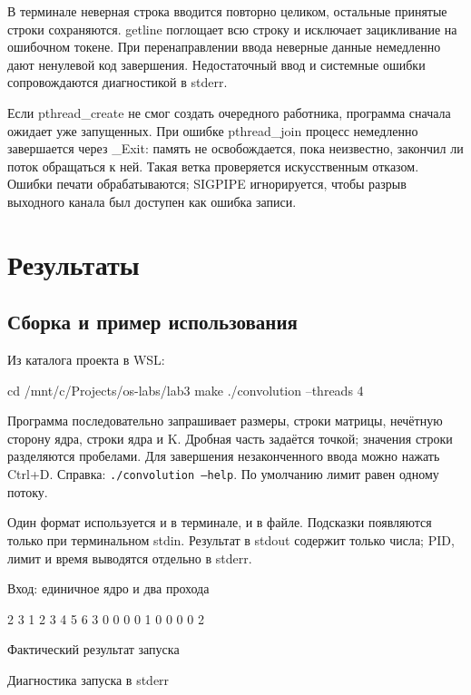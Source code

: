\documentclass[12pt,a4paper]{article}
\begin{document}
В терминале неверная строка вводится повторно целиком, остальные принятые строки сохраняются. getline поглощает всю строку и исключает зацикливание на ошибочном токене. При перенаправлении ввода неверные данные немедленно дают ненулевой код завершения. Недостаточный ввод и системные ошибки сопровождаются диагностикой в stderr.

Если pthread\_create не смог создать очередного работника, программа сначала ожидает уже запущенных. При ошибке pthread\_join процесс немедленно завершается через \_Exit: память не освобождается, пока неизвестно, закончил ли поток обращаться к ней. Такая ветка проверяется искусственным отказом. Ошибки печати обрабатываются; SIGPIPE игнорируется, чтобы разрыв выходного канала был доступен как ошибка записи.

\section{Результаты}

\subsection{Сборка и пример использования}

Из каталога проекта в WSL:
\begin{terminal}
cd /mnt/c/Projects/os-labs/lab3
make
./convolution --threads 4
\end{terminal}

Программа последовательно запрашивает размеры, строки матрицы, нечётную сторону ядра, строки ядра и K. Дробная часть задаётся точкой; значения строки разделяются пробелами. Для завершения незаконченного ввода можно нажать Ctrl+D. Справка: \texttt{./convolution --help}. По умолчанию лимит равен одному потоку.

Один формат используется и в терминале, и в файле. Подсказки появляются только при терминальном stdin. Результат в stdout содержит только числа; PID, лимит и время выводятся отдельно в stderr.

\begin{listingblock}{Вход: единичное ядро и два прохода}
\begin{terminal}
2 3
1 2 3
4 5 6
3
0 0 0
0 1 0
0 0 0
2
\end{terminal}
\end{listingblock}
\begin{listingblock}{Фактический результат запуска}
\end{listingblock}
\begin{listingblock}{Диагностика запуска в stderr}
\end{listingblock}
\end{document}
